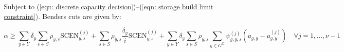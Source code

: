 \documentclass{article}
\newcommand{\sGeneratorsCandidate}{G^{\mathrm{C}}}
\newcommand{\sYears}{Y}
\newcommand{\sScenarios}{S}
\newcommand{\iGenerator}{g}
\newcommand{\iYear}{y}
\newcommand{\iYearTerminal}{\overline{\iYear}}
\newcommand{\iScenario}{s}
\newcommand{\cFixedOperationsMaintenanceCost}[1][\iYear]{\mathrm{FOM}_{#1}}
\newcommand{\cScenarioDuration}[1][\iYear,\iScenario]{\rho_{#1}}
\newcommand{\cInvestmentCost}[1][\iYear]{\mathrm{INV}_{#1}}
\newcommand{\cInterestRate}{i}
\newcommand{\cObjectiveFunction}{\mathrm{COST}}
\newcommand{\cOperatingCostScenario}[1][\iYear,\iScenario]{\mathrm{SCEN}_{#1}}
\newcommand{\cDiscountRate}[1][\iYear]{\delta_{#1}}
\newcommand{\vInstalledCapacityTotal}[1][\iGenerator,\iYear]{a_{#1}}
\newcommand{\vFixedCapacityDual}[1][\iGenerator,\iYear,\iScenario]{\psi_{#1}}
\begin{document}

Subject to (\ref{eqn: discrete capacity decision})--(\ref{eqn: storage build limit constraint}). Benders cuts are given by:

\begin{equation}
	\alpha \geq \sum\limits_{\iYear \in \sYears} \cDiscountRate \sum\limits_{\iScenario \in \sScenarios} \cScenarioDuration \cOperatingCostScenario^{(j)} + \sum\limits_{\iScenario \in \sScenarios} \cScenarioDuration[\iYearTerminal,\iScenario] \frac{\cDiscountRate[\iYearTerminal]}{\cInterestRate} \cOperatingCostScenario[\iYearTerminal,\iScenario]^{(j)} + \sum\limits_{\iYear \in \sYears} \cDiscountRate \sum\limits_{\iScenario \in \sScenarios} \cScenarioDuration \sum\limits_{\iGenerator \in \sGeneratorsCandidate} \vFixedCapacityDual^{(j)} \left(\vInstalledCapacityTotal - \vInstalledCapacityTotal^{(j)}\right) \quad \forall j = 1,\ldots,\nu-1
\end{equation}
\end{document}
